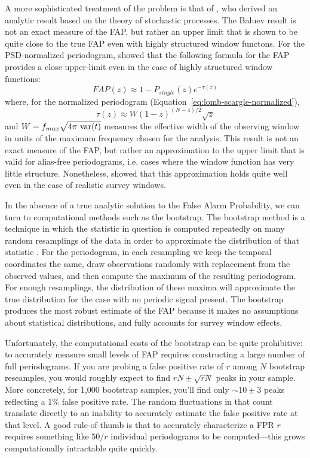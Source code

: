 \documentclass[preprint]{aastex}
\newcommand{\Eq}[1]{Equation~\ref{eq:#1}}
\newcommand{\eq}[1]{\Eq{#1}}
\newcommand{\eqlabel}[1]{\label{eq:#1}}
\begin{document}

A more sophisticated treatment of the problem is that of \citet{Baluev2008},
who derived an analytic result based on the theory of stochastic processes.
The Baluev result is not an exact measure of the FAP, but rather an upper
limit that is shown to be quite close to the true FAP even
with highly structured window functons.
For the PSD-normalized periodogram, \citet{Baluev2008} showed that the following
formula for the FAP provides a close upper-limit even in the case of
highly structured window functions:
\begin{equation}
  FAP(z) \approx 1 - P_{single}(z)e^{-\tau(z)}
  \eqlabel{FAP-baluev}
\end{equation}
where, for the normalized periodogram (\eq{lomb-scargle-normalized}),
\begin{equation}
  \tau(z) \approx W (1 - z)^{(N - 4)/2}\sqrt{z}
\end{equation}
and $W = f_{max} \sqrt{4\pi\ {\rm var}(t)}$ measures the effective width of the
observing window in units of the maximum frequency chosen for the analysis.
This result is not an exact measure of the FAP, but rather an approximation
to the upper limit that is valid for alias-free periodograms, {i.e.} cases
where the window function has very little structure.
Nonetheless, \citet{Baluev2008} showed that this approximation holds quite well
even in the case of realistic survey windows.

In the absence of a true analytic solution to the False Alarm Probability, we
can turn to computational methods such as the bootstrap.
The bootstrap method is a technique in which the statistic in question is
computed repeatedly on many random resamplings of the data in order to
approximate the distribution of that statistic
\citep[see][for a useful general discussion of this technique]{ICVG2014}.
For the periodogram, in each resampling we keep the temporal coordinates
the same, draw observations randomly with replacement from the observed
values, and then compute the maximum of the resulting periodogram.
For enough resamplings, the distribution of these maxima will approximate
the true distribution for the case with no periodic signal present.
The bootstrap produces the most robust estimate of the FAP because it makes
no assumptions about statistical distributions, and fully accounts for survey
window effects.

Unfortunately, the computational costs of the bootstrap can be quite
prohibitive: to accurately measure small levels of FAP requires constructing
a large number of full periodograms.
If you are probing a false positive rate of $r$ among $N$ bootstrap reseamples,
you would roughly expect to find $rN \pm \sqrt{rN}$ peaks in your sample.
More concretely, for 1,000 bootstrap samples, you'll find only $\sim 10\pm 3$
peaks reflecting a 1\% false positive rate.
The random fluctuations in that count translate directly to an inability to
accurately estimate the false positive rate at that level.
A good rule-of-thumb is that to accurately characterize a FPR $r$ requires
something like $50 / r$ individual periodograms to be computed---this grows
computationally intractable quite quickly.
\end{document}
